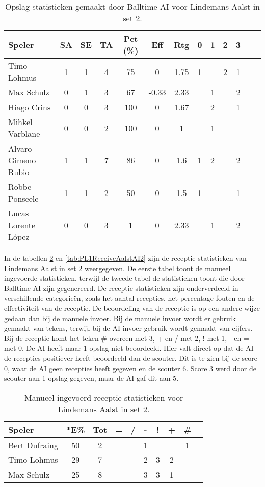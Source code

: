 \begin{table}[ht!]
  \centering
  \scriptsize
  \begin{tabular}{|l|c|c|c|c|c|c|c|c|c|c|c|c|} \hline
    \textbf{Speler} & SA & SE & TA & Pct (\%) & Eff & Rtg & 0 & 1 & 2 & 3 \\ \hline
    Timo Lohmus & 1 & 1 & 4 & 75 & 0 & 1.75 & 1 & & 2 & 1 \\
    Max Schulz & 0 & 1 & 3 & 67 & -0.33 & 2.33 &  & 1 &  & 2 \\
    Hiago Crins & 0 & 0 & 3 & 100 & 0 & 1.67 &  & 2 &  & 1 \\
    Mihkel Varblane & 0 & 0 & 2 & 100 & 0 & 1 &  & 1 &  &   \\
    Alvaro Gimeno Rubio & 1 & 1 & 7 & 86 & 0 & 1.6 & 1 & 2 &  & 2  \\
    Robbe Ponseele & 1 & 1 & 2 & 50 & 0 & 1.5 & 1 &  &  & 1  \\
    Lucas Lorente López & 0 & 0 & 3 & 1 & 0 & 2.33 &  & 1 &  & 2  \\ \hline
  \end{tabular}
  \caption[Opslag statistieken gemaakt door Balltime AI voor Lindemans Aalst in set 2]{\label{tab:PL1ServeAalstAI2}Opslag statistieken gemaakt door Balltime AI voor Lindemans Aalst in set 2.}
\end{table}

In de tabellen \ref{tab:PL1ReceiveAalstMan2} en \ref{tab:PL1ReceiveAalstAI2} zijn de receptie statistieken van Lindemans Aalst in set 2 weergegeven. De eerste tabel toont de manueel ingevoerde statistieken, terwijl de tweede tabel de statistieken toont die door Balltime AI zijn gegenereerd. De receptie statistieken zijn onderverdeeld in verschillende categorieën, zoals het aantal recepties, het percentage fouten en de effectiviteit van de receptie. De beoordeling van de receptie is op een andere wijze gedaan dan bij de manuele invoer. Bij de manuele invoer wordt er gebruik gemaakt van tekens, terwijl bij de AI-invoer gebruik wordt gemaakt van cijfers. Bij de receptie komt het teken \# overeen met 3, + en / met 2, ! met 1, - en = met 0. De AI heeft maar 1 opslag niet beoordeeld. Hier valt direct op dat de AI de recepties positiever heeft beoordeeld dan de scouter. Dit is te zien bij de score 0, waar de AI geen recepties heeft gegeven en de scouter 6. Score 3 werd door de scouter aan 1 opslag gegeven, maar de AI gaf dit aan 5.

\begin{table}[ht!]
  \centering
  \scriptsize
    \begin{tabular}{|l|c|c|c|c|c|c|c|c|c|}
      \hline
      \textbf{Speler} & *E\% & Tot & = & / & - & ! & + & \# \\ \hline
      Bert Dufraing  & 50 & 2 &  &  & 1 &  &  & 1 \\ 
      Timo Lohmus  & 29 & 7 &  & & 2 & 3 & 2 &    \\
      Max Schulz  & 25 & 8 &  &  & 3 & 3 & 1 &   \\ \hline
  \end{tabular}
  \caption[Manueel ingevoerd receptie statistieken voor Lindemans Aalst in set 2]{\label{tab:PL1ReceiveAalstMan2}Manueel ingevoerd receptie statistieken voor Lindemans Aalst in set 2.}
\end{table}

